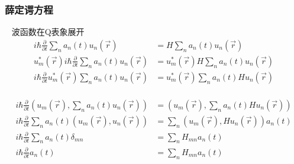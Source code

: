 \begin{frame} 
    \frametitle{薛定谔方程}
    \解~ 波函数在Q表象展开
    \begin{equation*}
        \begin{split}
            i\hbar \frac{\partial}{\partial t }\sum_n a_n(t) u_n(\vec{r})  &=H\sum_n a_n(t) u_n(\vec{r}) \\
            u_m ^* (\vec{r}) i\hbar \frac{\partial}{\partial t }\sum_n a_n(t) u_n(\vec{r})  &=u_m ^* (\vec{r})H\sum_n a_n(t) u_n(\vec{r}) \\
            i\hbar \frac{\partial}{\partial t }u_m ^* (\vec{r}) \sum_n a_n(t) u_n(\vec{r})  &=u_m ^* (\vec{r})\sum_n a_n(t) Hu_n(\vec{r}) \\      
        \end{split} 
    \end{equation*}
\end{frame}

\begin{frame} 
    \begin{equation*}
        \begin{split}
            i\hbar \frac{\partial}{\partial t }(u_m (\vec{r}), \sum_n a_n(t) u_n(\vec{r}) ) &=(u_m (\vec{r}), \sum_n a_n(t) Hu_n(\vec{r})) \\
            i\hbar \frac{\partial}{\partial t }\sum_n a_n(t)(u_m (\vec{r}),  u_n(\vec{r}) ) &=\sum_n (u_m (\vec{r}),  Hu_n(\vec{r}))a_n(t) \\
            i\hbar \frac{\partial}{\partial t }\sum_n a_n(t)\delta_{mn} &=\sum_n  H_{mn} a_n(t) \\
            i\hbar \frac{\partial}{\partial t } a_n(t) &=\sum_n H_{mn} a_n(t)  \\
        \end{split} 
    \end{equation*}
\end{frame}

